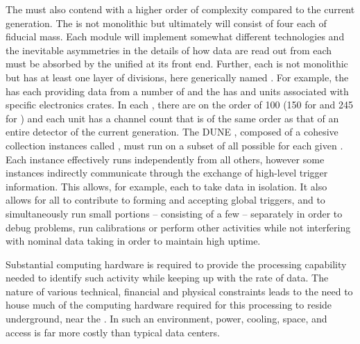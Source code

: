 The %
 must also contend with a higher order of
complexity compared to the current generation. 
The  is not monolithic but ultimately will consist
of four  each of \nominalmodsize fiducial mass. 
Each module will %
implement somewhat different %
technologies and the
inevitable asymmetries in the details of how data are read out from
each must be absorbed by the unified  at its front end. 
Further, each  is not monolithic but has at least one
layer of divisions, here generically named . 
For example, the   has  each
providing data from a number of  and the   has
 and  units associated with specific electronics
crates.
In each , there are on the order of \num{100} 
(\num{150} for  and \num{245} for ) and each unit has a
channel count that is of the same order as that of an entire \lartpc
detector of the current generation.
The DUNE , composed of a cohesive collection  instances
called
, must run on a subset of all possible
 for each given . 
Each instance effectively runs independently from all others, however
some instances indirectly communicate through the exchange of
high-level trigger information. 
This allows, for example, each  to take data in
isolation. It also allows for all  to contribute to forming and
accepting global  triggers, and to simultaneously run small portions -- consisting of a few  -- separately in
order to debug problems, run calibrations or %
 perform other activities while not interfering with nominal data taking in order to maintain high uptime.

Substantial computing hardware is required to provide the processing
capability needed to identify such activity while keeping up with the
rate of data.
The nature of various technical, financial and physical constraints
leads to the need to house much of the computing hardware %
required for this processing
to reside underground, near the . 
In such an environment, power, cooling, space, and access is far more
costly than typical data centers. %

